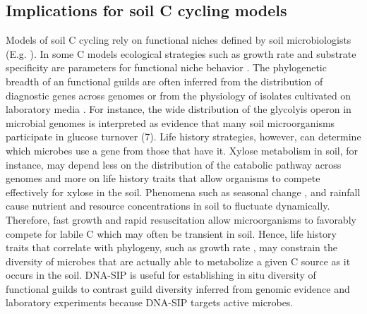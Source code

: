 \subsection{Implications for soil C cycling models}
Models of soil C cycling rely on functional niches defined by soil
microbiologists (E.g. \citep{wieder_2014a,Kaiser2014a}). In some C models
ecological strategies such as growth rate and substrate specificity are
parameters for functional niche behavior \citep{Kaiser2014a}. The phylogenetic
breadth of an functional guilds are often inferred from the distribution of
diagnostic genes across genomes \citep{Berlemont2013} or from the physiology of
isolates cultivated on laboratory media \citep{Martiny2013}. For instance, the
wide distribution of the glycolyis operon in microbial genomes is interpreted
as evidence that many soil microorganisms participate in glucose turnover (7).
Life history strategies, however, can determine
which microbes use a gene from those that have it. Xylose metabolism in soil,
for instance, may depend less on the distribution of the catabolic pathway
across genomes and more on life history traits that allow organisms to
compete effectively for xylose in the soil. Phenomena such as seasonal change
\citep{Schmidt2007}, and rainfall \citep{Evans2014a} cause nutrient and
resource concentrations in soil to fluctuate dynamically. Therefore, fast
growth and rapid resuscitation allow microorganisms to favorably compete for
labile C which may often be transient in soil. Hence, life history traits that
correlate with phylogeny, such as growth rate \citep{Fierer2007}, may constrain
the diversity of microbes that are actually able to metabolize a given C source
as it occurs in the soil. DNA-SIP is useful for establishing in situ diversity
of functional guilds to contrast guild diversity inferred from genomic evidence
and laboratory experiments because DNA-SIP targets active microbes. 

